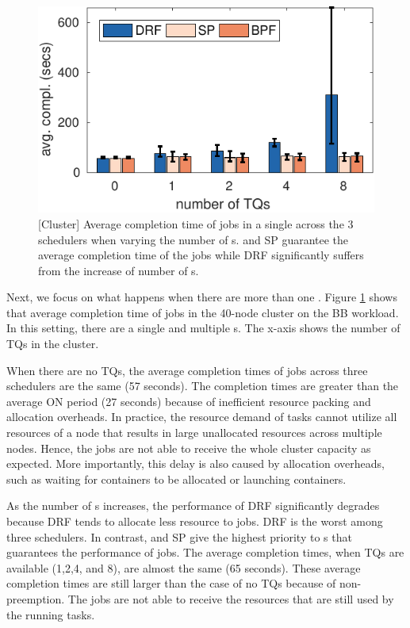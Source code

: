 \begin{figure}[!t]
\centering
\includegraphics[width=0.8\linewidth]{fig/busty_perf_grt_err_BB}
\caption{[Cluster] Average completion time of \burstq jobs in a single \burstq across the 3 schedulers when varying the number of {\batchq}s. \name and SP guarantee the average completion time of the \burstq jobs while DRF significantly suffers from the increase of number of {\batchq}s.}
\label{fig:busty_perf_grt}
\end{figure}
 
Next, we focus on what happens when there are more than one \batchq.
Figure \ref{fig:busty_perf_grt} shows that average completion time of \burstq jobs in the 40-node cluster on the BB workload. In this setting, there are a single \burstq and multiple {\batchq}s. The x-axis shows the number of TQs in the cluster.

When there are no TQs, the average completion times of \burstq jobs across three schedulers are the same (57 seconds).
The completion times are greater than the average ON period (27 seconds) because of inefficient resource packing and allocation overheads.
In practice, the resource demand of tasks cannot utilize all resources of a node that results in large unallocated resources across multiple nodes.
Hence, the \burstq jobs are not able to receive the whole cluster capacity as expected.
More importantly, this delay is also caused by allocation overheads, such as waiting for containers to be allocated or launching containers.

As the number of {\batchq}s increases, the performance of DRF significantly degrades because DRF tends to allocate less resource to {\burstq} jobs.
DRF is the worst among three schedulers. In contrast, \name and SP give the highest priority to {\burstq}s that guarantees the performance of \burstq jobs.
The average completion times, when TQs are available (1,2,4, and 8), are almost the same (65 seconds).
These average completion times are still larger than the case of no TQs because of non-preemption.
The \burstq jobs are not able to receive the resources that are still used by the running tasks. 

